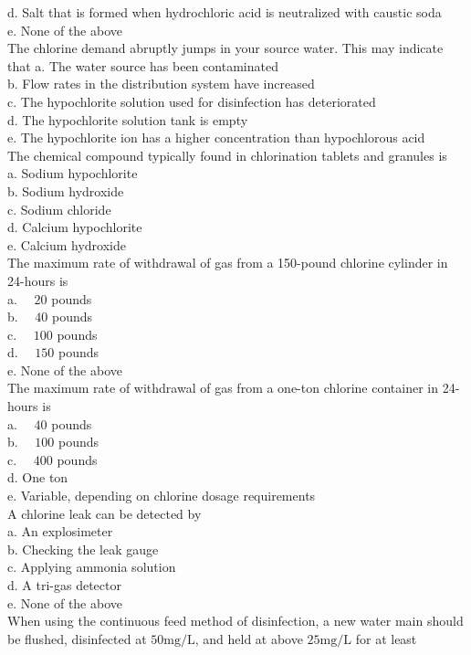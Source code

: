 d. Salt that is formed when hydrochloric acid is neutralized with caustic soda\\
e. None of the above\\
  The chlorine demand abruptly jumps in your source water. This may indicate that a. The water source has been contaminated\\
b. Flow rates in the distribution system have increased\\
c. The hypochlorite solution used for disinfection has deteriorated\\
d. The hypochlorite solution tank is empty\\
e. The hypochlorite ion has a higher concentration than hypochlorous acid\\
  The chemical compound typically found in chlorination tablets and granules is\\
a. Sodium hypochlorite\\
b. Sodium hydroxide\\
c. Sodium chloride\\
d. Calcium hypochlorite\\
e. Calcium hydroxide\\
The maximum rate of withdrawal of gas from a 150-pound chlorine cylinder in 24-hours is\\
a. $\quad 20$ pounds\\
b. $\quad 40$ pounds\\
c. $\quad 100$ pounds\\
d. $\quad 150$ pounds\\
e. None of the above\\
  The maximum rate of withdrawal of gas from a one-ton chlorine container in 24-hours is\\
a. $\quad 40$ pounds\\
b. $\quad 100$ pounds\\
c. $\quad 400$ pounds\\
d. One ton\\
e. Variable, depending on chlorine dosage requirements\\
  A chlorine leak can be detected by\\
a. An explosimeter\\
b. Checking the leak gauge\\
c. Applying ammonia solution\\
d. A tri-gas detector\\
e. None of the above\\
When using the continuous feed method of disinfection, a new water main should be flushed, disinfected at $50 \mathrm{mg} / \mathrm{L}$, and held at above $25 \mathrm{mg} / \mathrm{L}$ for at least\\
